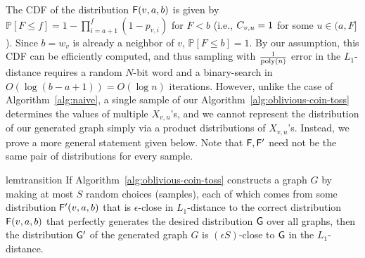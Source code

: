 The CDF of the distribution $\mathsf{F}(v,a,b)$ is given by $\mathbb P[F \leq f] = 1-\prod_{i=a+1}^{f} (1-p_{v,i})$ for $F<b$
(i.e., $C_{v,u} = \mathsf{1}$ for some $u \in (a,F]$).
Since $b=w_v$ is already a neighbor of $v$, $\mathbb P[F \leq b] = 1$.
By our assumption, this CDF can be efficiently computed, and thus sampling with $\frac{1}{\mathrm{poly}(n)}$ error in the $L_1$-distance requires a random $N$-bit word and a binary-search in $O(\log (b-a+1)) = O(\log n)$ iterations.
However, unlike the case of Algorithm~\ref{alg:naive}, a single sample of our Algorithm~\ref{alg:oblivious-coin-toss} determines the values of multiple $X_{v,u}$'s, and we cannot represent the distribution of our generated graph simply via a product distributions of $X_{v,u}$'s.
Instead, we prove a more general statement given below.
Note that $\mathsf{F}, \mathsf{F}'$ need not be the same pair of distributions for every sample.
\begin{restatable}{lem}{transition}\label{lemma:transition}
If Algorithm~\ref{alg:oblivious-coin-toss} constructs a graph $G$ by making at most $S$ random choices (samples), each of which comes from some distribution $\mathsf{F}'(v,a,b)$ that is $\epsilon$-close in $L_1$-distance to the correct distribution $\mathsf{F}(v,a,b)$ that perfectly generates the desired distribution $\mathsf{G}$ over all graphs, then the distribution $\mathsf{G}'$ of the generated graph $G$ is $(\epsilon S)$-close to $\mathsf{G}$ in the $L_1$-distance.
\end{restatable}

